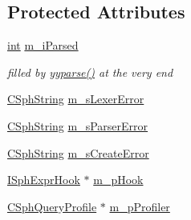 \subsection*{Protected Attributes}
\begin{DoxyCompactItemize}
\item 
\hyperlink{sphinxexpr_8cpp_a4a26e8f9cb8b736e0c4cbf4d16de985e}{int} \hyperlink{classExprParser__t_aba3a3f30a0d2dfb9328d0e2704521f62}{m\-\_\-i\-Parsed}
\begin{DoxyCompactList}\small\item\em filled by \hyperlink{classExprParser__t_ab2a3c65be4ab0f1397955f13bc449882}{yyparse()} at the very end \end{DoxyCompactList}\item 
\hyperlink{structCSphString}{C\-Sph\-String} \hyperlink{classExprParser__t_a6d7581b6081e3ece130da320127b5567}{m\-\_\-s\-Lexer\-Error}
\item 
\hyperlink{structCSphString}{C\-Sph\-String} \hyperlink{classExprParser__t_ac5b3f0ac3ff816672f3a53910fe1cab9}{m\-\_\-s\-Parser\-Error}
\item 
\hyperlink{structCSphString}{C\-Sph\-String} \hyperlink{classExprParser__t_a8c068b7d7601894faac60b246b8121f5}{m\-\_\-s\-Create\-Error}
\item 
\hyperlink{structISphExprHook}{I\-Sph\-Expr\-Hook} $\ast$ \hyperlink{classExprParser__t_ac16eb0ef48c64efb2399b3d7d619a503}{m\-\_\-p\-Hook}
\item 
\hyperlink{classCSphQueryProfile}{C\-Sph\-Query\-Profile} $\ast$ \hyperlink{classExprParser__t_a4d9a86a0994fdb3082077239d5dc7c09}{m\-\_\-p\-Profiler}
\end{DoxyCompactItemize}
